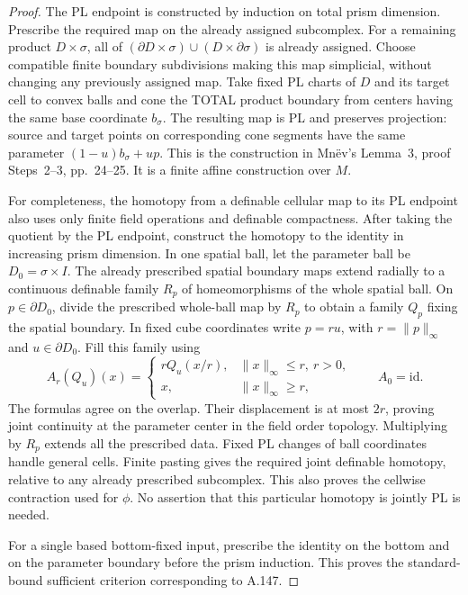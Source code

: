 \begin{proof}
The PL endpoint is constructed by induction on total prism
dimension. Prescribe the required map on the already assigned
subcomplex. For a remaining product $D\times\sigma$, all of
$(\partial D\times\sigma)\cup(D\times\partial\sigma)$ is
already assigned. Choose compatible finite boundary
subdivisions making this map simplicial, without changing
any previously assigned map. Take fixed PL charts of $D$
and its target cell to convex balls and cone the TOTAL
product boundary from centers having the same base coordinate
$b_\sigma$. The resulting map is PL and preserves projection:
source and target points on corresponding cone segments have
the same parameter $(1-u)b_\sigma+up$. This is the construction
in Mn\"ev's Lemma~3, proof Steps~2--3, pp.~24--25.
It is a finite affine construction over $M$.

For completeness, the homotopy from a definable cellular map
to its PL endpoint also uses only finite field operations and
definable compactness. After taking the quotient by the PL
endpoint, construct the homotopy to the identity in increasing
prism dimension. In one spatial ball, let the parameter ball
be $D_0=\sigma\times I$. The already prescribed spatial
boundary maps extend radially to a continuous definable
family $R_p$ of homeomorphisms of the whole spatial ball.
On $p\in\partial D_0$, divide the prescribed whole-ball map
by $R_p$ to obtain a family $Q_p$ fixing the spatial boundary.
In fixed cube coordinates write $p=ru$, with
$r=\|p\|_\infty$ and $u\in\partial D_0$. Fill this family
using
\[
 A_r(Q_u)(x)=
 \begin{cases}
 rQ_u(x/r),&\|x\|_\infty\le r,\ r>0,\\
 x,&\|x\|_\infty\ge r,
 \end{cases}
 \qquad A_0=\mathrm{id}.
 \tag{159.6}
\]
The formulas agree on the overlap. Their displacement is at
most $2r$, proving joint continuity at the parameter center
in the field order topology. Multiplying by $R_p$ extends
all the prescribed data. Fixed PL changes of ball coordinates
handle general cells. Finite pasting gives the required joint
definable homotopy, relative to any already prescribed
subcomplex. This also proves the cellwise contraction used
for $\phi$. No assertion that this particular homotopy is
jointly PL is needed.

For a single based bottom-fixed input, prescribe the identity
on the bottom and on the parameter boundary before the prism
induction. This proves the standard-bound sufficient criterion
corresponding to A.147.


\end{proof}
